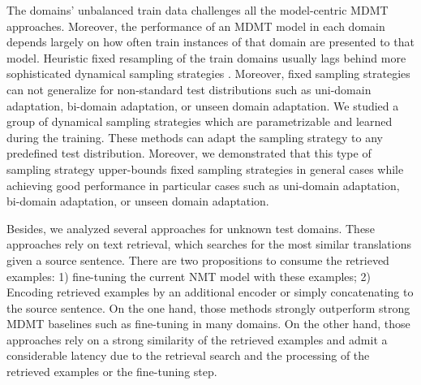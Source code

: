 The domains' unbalanced train data challenges all the model-centric MDMT approaches. Moreover, the performance of an MDMT model in each domain depends largely on how often train instances of that domain are presented to that model. Heuristic fixed resampling of the train domains usually lags behind more sophisticated dynamical sampling strategies \citep{Wang20balancing}. Moreover, fixed sampling strategies can not generalize for non-standard test distributions such as uni-domain adaptation, bi-domain adaptation, or unseen domain adaptation. We studied a group of dynamical sampling strategies which are parametrizable and learned during the training. These methods can adapt the sampling strategy to any predefined test distribution. Moreover, we demonstrated that this type of sampling strategy upper-bounds fixed sampling strategies in general cases while achieving good performance in particular cases such as uni-domain adaptation, bi-domain adaptation, or unseen domain adaptation.

Besides, we analyzed several approaches for unknown test domains. These approaches rely on text retrieval, which searches for the most similar translations given a source sentence. There are two propositions to consume the retrieved examples: 1) fine-tuning the current NMT model with these examples; 2) Encoding retrieved examples by an additional encoder or simply concatenating to the source sentence. On the one hand, those methods strongly outperform strong MDMT baselines such as fine-tuning in many domains. On the other hand, those approaches rely on a strong similarity of the retrieved examples and admit a considerable latency due to the retrieval search and the processing of the retrieved examples or the fine-tuning step.

